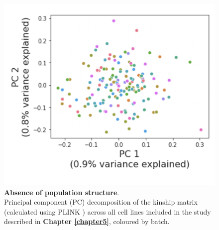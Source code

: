 \begin{figure}[h]
    \centering
    \includegraphics[width=14cm]{Appendix2/Fig/suppl_pop_struct_pc.png}
    \caption[Absence of population structure]{\textbf{Absence of population structure}.\\
    Principal component (PC) decomposition of the kinship matrix (calculated using PLINK \cite{purcell2007plink}) across all cell lines included in the study described in \textbf{Chapter \ref{chapter5}}, coloured by batch.}
    \label{suppl_fig:no_pop_struct}
\end{figure}